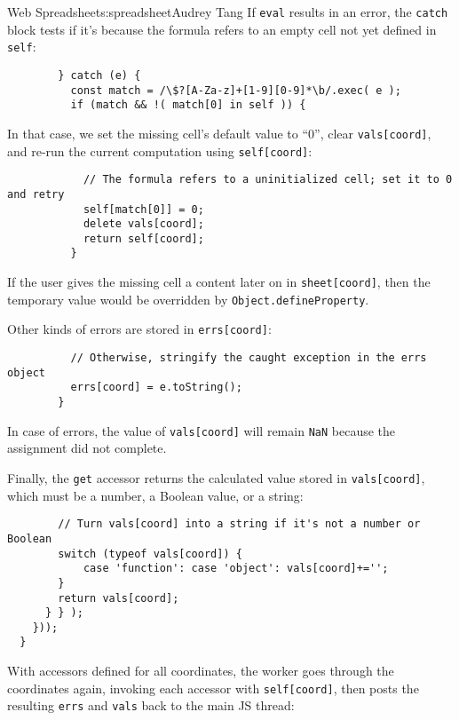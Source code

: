 \begin{aosachapter}{Web Spreadsheet}{s:spreadsheet}{Audrey Tang}
If \texttt{eval} results in an error, the \texttt{catch} block tests if
it's because the formula refers to an empty cell not yet defined in
\texttt{self}:

\begin{verbatim}
        } catch (e) {
          const match = /\$?[A-Za-z]+[1-9][0-9]*\b/.exec( e );
          if (match && !( match[0] in self )) {
\end{verbatim}

In that case, we set the missing cell's default value to ``0'', clear
\texttt{vals{[}coord{]}}, and re-run the current computation using
\texttt{self{[}coord{]}}:

\begin{verbatim}
            // The formula refers to a uninitialized cell; set it to 0 and retry
            self[match[0]] = 0;
            delete vals[coord];
            return self[coord];
          }
\end{verbatim}

If the user gives the missing cell a content later on in
\texttt{sheet{[}coord{]}}, then the temporary value would be overridden
by \texttt{Object.defineProperty}.

Other kinds of errors are stored in \texttt{errs{[}coord{]}}:

\begin{verbatim}
          // Otherwise, stringify the caught exception in the errs object
          errs[coord] = e.toString();
        }
\end{verbatim}

In case of errors, the value of \texttt{vals{[}coord{]}} will remain
\texttt{NaN} because the assignment did not complete.

Finally, the \texttt{get} accessor returns the calculated value stored
in \texttt{vals{[}coord{]}}, which must be a number, a Boolean value, or
a string:

\begin{verbatim}
        // Turn vals[coord] into a string if it's not a number or Boolean
        switch (typeof vals[coord]) { 
            case 'function': case 'object': vals[coord]+=''; 
        }
        return vals[coord];
      } } );
    }));
  }
\end{verbatim}

With accessors defined for all coordinates, the worker goes through the
coordinates again, invoking each accessor with \texttt{self{[}coord{]}},
then posts the resulting \texttt{errs} and \texttt{vals} back to the
main JS thread:


\end{aosachapter}
